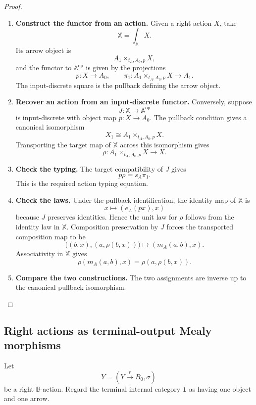 \begin{proof}
\leavevmode
\begin{enumerate}
\item \textbf{Construct the functor from an action.}
Given a right action \(X\), take
\[
\mathbb X=\int_{\mathbb A}X.
\]
Its arrow object is
\[
A_1\times_{t_A,A_0,p}X,
\]
and the functor to \(\mathbb A^{\mathrm{op}}\) is given by the projections
\[
p:X\to A_0,
\qquad
\pi_1:A_1\times_{t_A,A_0,p}X\to A_1.
\]
The input-discrete square is the pullback defining the arrow object.

\item \textbf{Recover an action from an input-discrete functor.}
Conversely, suppose
\[
J:\mathbb X\to\mathbb A^{\mathrm{op}}
\]
is input-discrete with object map \(p:X\to A_0\). The pullback condition gives
a canonical isomorphism
\[
X_1\cong A_1\times_{t_A,A_0,p}X.
\]
Transporting the target map of \(\mathbb X\) across this isomorphism gives
\[
\rho:A_1\times_{t_A,A_0,p}X\to X.
\]

\item \textbf{Check the typing.}
The target compatibility of \(J\) gives
\[
p\rho=s_A\pi_1.
\]
This is the required action typing equation.

\item \textbf{Check the laws.}
Under the pullback identification, the identity map of \(\mathbb X\) is
\[
x\longmapsto(e_A(px),x)
\]
because \(J\) preserves identities. Hence the unit law for \(\rho\) follows
from the identity law in \(\mathbb X\). Composition preservation by \(J\)
forces the transported composition map to be
\[
\bigl((b,x),(a,\rho(b,x))\bigr)
\longmapsto
(m_A(a,b),x).
\]
Associativity in \(\mathbb X\) gives
\[
\rho(m_A(a,b),x)=\rho(a,\rho(b,x)).
\]

\item \textbf{Compare the two constructions.}
The two assignments are inverse up to the canonical pullback isomorphism.
\end{enumerate}
\end{proof}


\subsection{Right actions as terminal-output Mealy morphisms}
\label{subsec:relative-actions-terminal-output-mealy}

Let
\[
    Y=(Y\xrightarrow{r}B_0,\sigma)
\]
be a right \(\mathbb B\)-action.  Regard the terminal internal category
\(\mathbf 1\) as having one object and one arrow.

